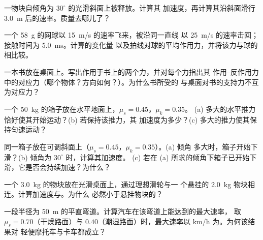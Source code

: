 \begin{exercise}[$\star$]\label{exo:g12:newtons-laws:3}
一物块自倾角为 $30^\circ$ 的光滑斜面上被释放。计算其
加速度，再计算其沿斜面滑行 \qty{3.0}{m} 后的速率。质量去哪儿了？
\end{exercise}

\begin{exercise}[$\star$]\label{exo:g12:newtons-laws:4}
一个 \qty{58}{g} 的网球以 \qty{15}{m/s} 的速率飞来，被沿同一直线
以 \qty{25}{m/s} 的速率击回；接触时间为 \qty{5.0}{ms}。计算的变化量
以及拍线对球的平均作用力，并将该力与球的相比较。
\end{exercise}

\begin{exercise}[$\star$]\label{exo:g12:newtons-laws:5}
一本书放在桌面上。写出作用于书上的两个力，并对每个力指出其
作用–反作用力中的对应力（哪个物体？方向如何？）。为什么书所受的
与桌面对书的支持力不互为对应力？
\end{exercise}

\begin{exercise}[$\star\star$]\label{exo:g12:newtons-laws:6}
一个 \qty{50}{kg} 的箱子放在水平地面上，$\mu_s = 0.45$，$\mu_k = 0.35$。
(a) 多大的水平推力恰好使其开始运动？(b) 若保持该推力，其
加速度为多少？(c) 多大的推力使其保持匀速运动？
\end{exercise}

\begin{exercise}[$\star\star$]\label{exo:g12:newtons-laws:7}
同一箱子放在可调斜面上（$\mu_s = 0.45$，$\mu_k = 0.35$）。(a) 倾角
多大时，箱子开始下滑？(b) 倾角为 $30^\circ$ 时，计算其加速度。
(c) 若在 (a) 所求的倾角下箱子已开始下滑，它是否会持续加速？为什么？
\end{exercise}

\begin{exercise}[$\star\star$]\label{exo:g12:newtons-laws:8}
一个 \qty{3.0}{kg} 的物块放在光滑桌面上，通过理想滑轮与一
个悬挂的 \qty{2.0}{kg} 物块相连。计算加速度与。为什么
必然小于悬挂物块的？
\end{exercise}

\begin{exercise}[$\star\star$]\label{exo:g12:newtons-laws:9}
一段半径为 \qty{50}{m} 的平直弯道。计算汽车在该弯道上能达到的最大速率，
取 $\mu_s = 0.70$（干燥路面）与 $0.40$（潮湿路面）时，最大速率以 \unit{km/h} 为。为何该结果对
轻便摩托车与卡车都成立？
\end{exercise}

